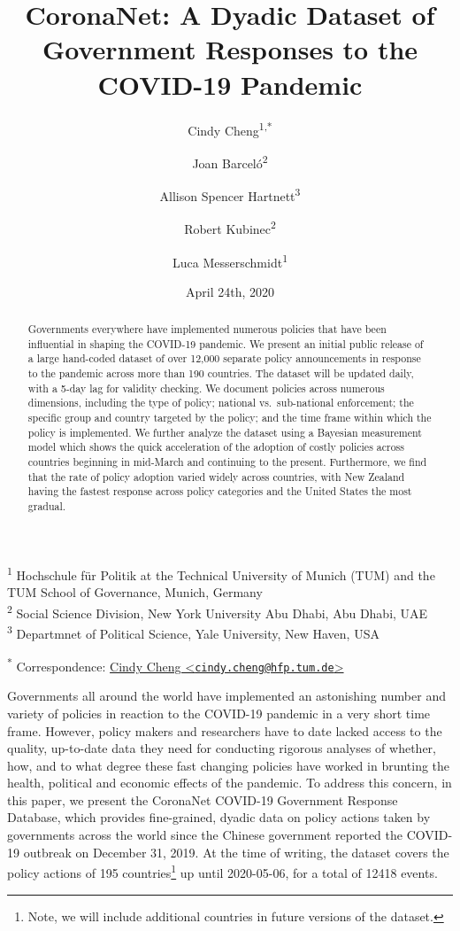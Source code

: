 \documentclass[
]{article}
\title{CoronaNet: A Dyadic Dataset of Government Responses to the COVID-19 Pandemic}
\author{Cindy Cheng\textsuperscript{1,*} \and Joan Barceló\textsuperscript{2} \and Allison Spencer Hartnett\textsuperscript{3} \and Robert Kubinec\textsuperscript{2} \and Luca Messerschmidt\textsuperscript{1}}
\date{April 24th, 2020}
\begin{document}
\maketitle
\begin{abstract}
Governments everywhere have implemented numerous policies that have been influential in shaping the COVID-19 pandemic. We present an initial public release of a large hand-coded dataset of over 12,000 separate policy announcements in response to the pandemic across more than 190 countries. The dataset will be updated daily, with a 5-day lag for validity checking. We document policies across numerous dimensions, including the type of policy; national vs.~sub-national enforcement; the specific group and country targeted by the policy; and the time frame within which the policy is implemented. We further analyze the dataset using a Bayesian measurement model which shows the quick acceleration of the adoption of costly policies across countries beginning in mid-March and continuing to the present. Furthermore, we find that the rate of policy adoption varied widely across countries, with New Zealand having the fastest response across policy categories and the United States the most gradual.
\end{abstract}

\textsuperscript{1} Hochschule für Politik at the Technical University of Munich (TUM) and the TUM School of Governance, Munich, Germany\\
\textsuperscript{2} Social Science Division, New York University Abu Dhabi, Abu Dhabi, UAE\\
\textsuperscript{3} Departmnet of Political Science, Yale University, New Haven, USA

\textsuperscript{*} Correspondence: \href{mailto:cindy.cheng@hfp.tum.de}{Cindy Cheng \textless{}\href{mailto:cindy.cheng@hfp.tum.de}{\nolinkurl{cindy.cheng@hfp.tum.de}}\textgreater{}}

\newpage

Governments all around the world have implemented an astonishing number and variety of policies in reaction to the COVID-19 pandemic in a very short time frame. However, policy makers and researchers have to date lacked access to the quality, up-to-date data they need for conducting rigorous analyses of whether, how, and to what degree these fast changing policies have worked in brunting the health, political and economic effects of the pandemic. To address this concern, in this paper, we present the CoronaNet COVID-19 Government Response Database, which provides fine-grained, dyadic data on policy actions taken by governments across the world since the Chinese government reported the COVID-19 outbreak on December 31, 2019. At the time of writing, the dataset covers the policy actions of 195 countries\footnote{Note, we will include additional countries in future versions of the dataset.} up until 2020-05-06, for a total of 12418 events.
\end{document}
